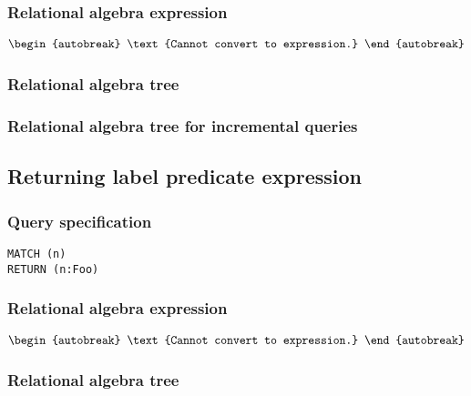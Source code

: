 \subsubsection*{Relational algebra expression}

\begin{align*}
\begin{autobreak}
\text{Cannot convert to expression.}
\end{autobreak}
\end{align*}

\subsubsection*{Relational algebra tree}


\subsubsection*{Relational algebra tree for incremental queries}


\subsection{Returning label predicate expression}

\subsubsection*{Query specification}

\begin{lstlisting}
MATCH (n)
RETURN (n:Foo)
\end{lstlisting}

\subsubsection*{Relational algebra expression}

\begin{align*}
\begin{autobreak}
\text{Cannot convert to expression.}
\end{autobreak}
\end{align*}

\subsubsection*{Relational algebra tree}

